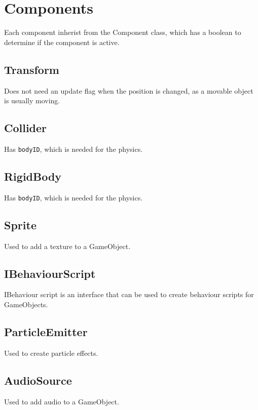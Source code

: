 \section{Components}

Each component inherist from the Component class, which has a boolean to determine if the component is active.
\subsection{Transform}
Does not need an update flag when the position is changed, as a movable object is usually moving.

\subsection{Collider}
Has \texttt{bodyID}, which is needed for the physics.

\subsection{RigidBody}
Has \texttt{bodyID}, which is needed for the physics.

\subsection{Sprite}
Used to add a texture to a GameObject.

\subsection{IBehaviourScript}
IBehaviour script is an interface that can be used to create behaviour scripts for GameObjects.

\subsection{ParticleEmitter}
Used to create particle effects.

\subsection{AudioSource}
Used to add audio to a GameObject.
